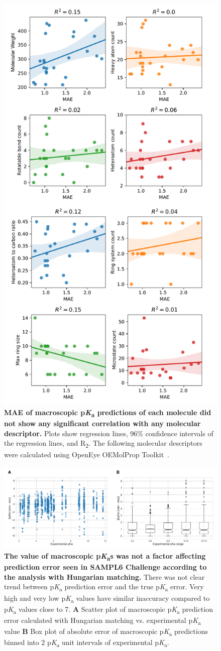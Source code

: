 \documentclass[9pt,lineno,final]{elife}
\newcommand{\pKa}{p\textit{K}\textsubscript{a}}
\begin{document}
\begin{figure}
\centering
\includegraphics[width=0.5\linewidth]{figures/molecular_properties_vs_MAE_correlation_fig.pdf}
\caption{ {\bf MAE of macroscopic \pKa{} predictions of each molecule did not show any significant correlation with any molecular descriptor.} Plots show regression lines, 96\% confidence intervals of the regression lines, and R\textsubscript{2}. The following molecular descriptors were calculated using OpenEye OEMolProp Toolkit~\citep{oemolprop_openeye_2017}.
}
\label{fig:molecular_properties_vs_MAE_correlation}
\end{figure}


\begin{figure}
\centering
\includegraphics[width=1.0\linewidth]{figures/typeIII_error_vs_exp_pKa.pdf}
\caption{ {\bf The value of macroscopic \pKa{}s was not a factor affecting prediction error seen in SAMPL6 Challenge according to the analysis with Hungarian matching.} There was not clear trend between \pKa{} prediction error and the true \pKa{} error. Very high and very low \pKa{} values have similar inaccuracy compared to \pKa{} values close to 7. {\bf A} Scatter plot of macroscopic \pKa{} prediction error calculated with Hungarian matching vs. experimental \pKa{} value {\bf B} Box plot of absolute error of macroscopic \pKa{} predictions binned into 2 \pKa{} unit intervals of experimental \pKa{}.
}
\label{fig:macroscopic-pKa-error-vs-pKa-value}
\end{figure}
\end{document}
